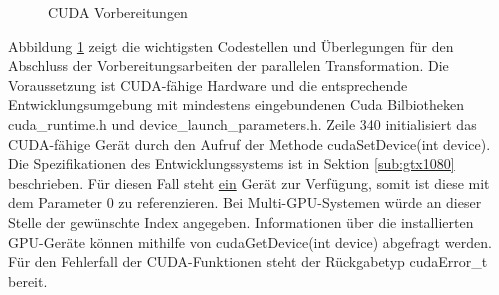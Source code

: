 \begin{figure}[t!]
	
	
	
	
	
	
	
	\caption{CUDA Vorbereitungen}
	\label{fig:cudaFourierTransform}
\end{figure}

Abbildung \ref{fig:cudaFourierTransform} zeigt die wichtigsten Codestellen und Überlegungen für den Abschluss der Vorbereitungsarbeiten der parallelen Transformation. Die Voraussetzung ist CUDA-fähige Hardware und die entsprechende Entwicklungsumgebung mit mindestens eingebundenen Cuda Bilbiotheken cuda\_runtime.h und device\_launch\_parameters.h.
Zeile 340 initialisiert das CUDA-fähige Gerät durch den Aufruf der Methode cudaSetDevice(int device). Die Spezifikationen des Entwicklungssystems ist in Sektion \ref{sub:gtx1080} beschrieben. Für diesen Fall steht \underline{ein} Gerät zur Verfügung, somit ist diese mit dem Parameter 0 zu referenzieren. Bei Multi-GPU-Systemen würde an dieser Stelle der gewünschte Index angegeben. Informationen über die installierten GPU-Geräte können mithilfe von cudaGetDevice(int device) abgefragt werden. Für den Fehlerfall der CUDA-Funktionen steht der Rückgabetyp cudaError\_t bereit. 


